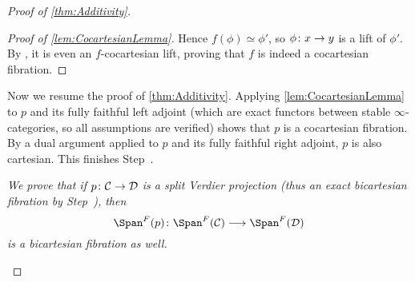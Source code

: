\documentclass[a4paper, 10pt, oneside, DIV=9, chapterprefix=true, numbers=enddot,bibliography=totoc]{scrbook}
\newcommand{\embrace}[1]{\textup{(}#1\textup{)}}
\begin{document}
\begin{proof}[Proof of \cref{thm:Additivity}]
\begin{proof}[Proof of \cref{lem:CocartesianLemma}]
		Hence $f(\phi)\simeq \phi'$, so $\phi\colon x\morphism y$ is a lift of $\phi'$. By , it is even an $f$-cocartesian lift, proving that $f$ is indeed a cocartesian fibration.
	\end{proof}
	Now we resume the proof of \cref{thm:Additivity}. Applying \cref{lem:CocartesianLemma} to $p$ and its fully faithful left adjoint (which are exact functors between stable $\infty$-categories, so all assumptions are verified) shows that $p$ is a cocartesian fibration. By a dual argument applied to $p$ and its fully faithful right adjoint, $p$ is also cartesian. This finishes Step~.
	\begin{alphanumerate}
		\item[\itememph{2}] \itshape We prove that if $p\colon \Cc\morphism\Dd$ is a split Verdier projection \embrace{thus an exact bicartesian fibration by Step~}, then 
		\begin{equation*}
			\Span^F(p)\colon \Span^F(\Cc)\morphism\Span^F(\Dd)
		\end{equation*}
		is a  bicartesian fibration as well.
	\end{alphanumerate}


\end{proof}
\end{document}
